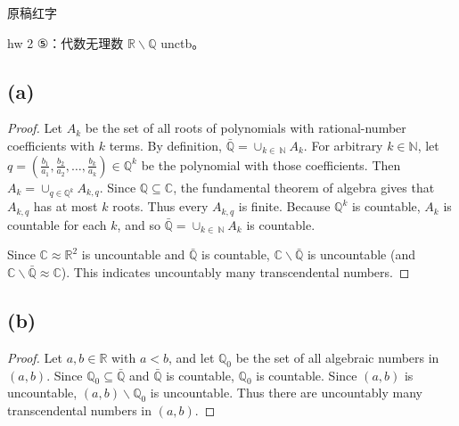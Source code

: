 \begin{qlnote}{原稿红字}

hw 2 ⑤：代数无理数 \(\mathbb{R} \smallsetminus \mathbb{Q}\) unctb。

\end{qlnote}

\subsection{(a)}

\begin{proof}

Let \(A_{k}\) be the set of all roots of polynomials with rational-number coefficients with \(k\) terms. By definition, \(\bar{\mathbb{Q}} = \cup_{k \in \ \mathbb{N}}A_{k}\). For arbitrary \(k \in \mathbb{N}\), let \(q = \left( {\frac{b_{1}}{a_{1}},\frac{b_{2}}{a_{2}},\ldots,\frac{b_{k}}{a_{k}}} \right) \in \mathbb{Q}^{k}\) be the polynomial with those coefficients. Then \(A_{k} = \cup_{q \in \mathbb{Q}^{k}}A_{k,q}\). Since \(\mathbb{Q} \subseteq \mathbb{C}\), the fundamental theorem of algebra gives that \(A_{k,q}\) has at most \(k\) roots. Thus every \(A_{k,q}\) is finite. Because \(\mathbb{Q}^{k}\) is countable, \(A_{k}\) is countable for each \(k\), and so \(\bar{\mathbb{Q}} = \cup_{k \in \ \mathbb{N}}A_{k}\) is countable.

Since \(\mathbb{C} \approx \mathbb{R}^{2}\) is uncountable and \(\bar{\mathbb{Q}}\) is countable, \(\mathbb{C} \smallsetminus \bar{\mathbb{Q}}\) is uncountable (and \(\mathbb{C} \smallsetminus \bar{\mathbb{Q}} \approx \mathbb{C}\)). This indicates uncountably many transcendental numbers.

\end{proof}

\subsection{(b)}

\begin{proof}

Let \(a,b \in \mathbb{R}\) with \(a < b\), and let \(\mathbb{Q}_{0}\) be the set of all algebraic numbers in \(\left( {a,b} \right)\). Since \(\mathbb{Q}_{0} \subseteq \bar{\mathbb{Q}}\) and \(\bar{\mathbb{Q}}\) is countable, \(\mathbb{Q}_{0}\) is countable. Since \(\left( {a,b} \right)\) is uncountable, \(\left( {a,b} \right) \smallsetminus \mathbb{Q}_{0}\) is uncountable. Thus there are uncountably many transcendental numbers in \(\left( {a,b} \right)\).

\end{proof}

